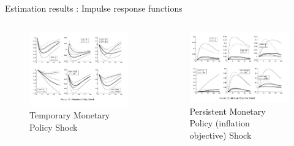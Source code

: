 \documentclass{beamer}
\begin{document}
\begin{frame}{Estimation results : Impulse response functions}

\begin{columns}
\hspace{-0.5cm}
		\begin{figure}
			\centering
			\includegraphics[width=1.1\textwidth]{images/IRF.JPG}
			\caption{\small Temporary Monetary Policy Shock}
		\end{figure}	
		\begin{figure}
			\centering
			\includegraphics[width=1.1\textwidth]{images/irf inf obj.JPG}
			\caption{\small Persistent Monetary Policy (inflation objective) Shock}
		\end{figure}
\end{columns}

\end{frame} 
\end{document}
